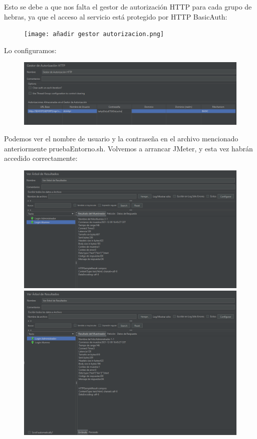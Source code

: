 \documentclass[a4paper]{article}
\begin{document}
\newpage Esto se debe a que nos falta el gestor de autorización HTTP para 
cada grupo de hebras, ya que el acceso al servicio está protegido por HTTP BasicAuth:
\begin{figure}[hbt!]
    \texttt{[image: añadir gestor autorizacion.png]}
\end{figure}
\newline Lo configuramos: 
\begin{figure}[hbt!]
    \includegraphics[width=\textwidth]{gestor autorizacion configurado.png}
\end{figure}
\newline Podemos ver el nombre de usuario y la contraseña en el archivo mencionado anteriormente
pruebaEntorno.sh.
\newpage
Volvemos a arrancar JMeter, y esta vez habrán accedido correctamente:
\begin{figure}[hbt!]
    \includegraphics[width=\textwidth]{login alumno correcto.png}
    \includegraphics[width=\textwidth]{login administrador correcto.png}
\end{figure}
\newpage
\end{document}
